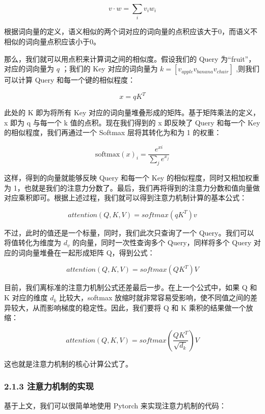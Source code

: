\documentclass[
]{article}
\begin{document}
\[
v·w = \sum_{i}v_iw_i
\]

根据词向量的定义，语义相似的两个词对应的词向量的点积应该大于0，而语义不相似的词向量点积应该小于0。

那么，我们就可以用点积来计算词之间的相似度。假设我们的 Query
为``fruit''，对应的词向量为 \(q\) ；我们的 Key 对应的词向量为
\(k = [v_{apple} v_{banana} v_{chair}]\) ,则我们可以计算 Query
和每一个键的相似程度：

\[
x = qK^T
\]

此处的 K 即为将所有 Key
对应的词向量堆叠形成的矩阵。基于矩阵乘法的定义，x 即为 q 与每一个 k
值的点积。现在我们得到的 x 即反映了 Query 和每一个 Key
的相似程度，我们再通过一个 Softmax 层将其转化为和为 1 的权重：

\[
\text{softmax}(x)_i = \frac{e^{xi}}{\sum_{j}e^{x_j}}
\]

这样，得到的向量就能够反映 Query 和每一个 Key
的相似程度，同时又相加权重为
1，也就是我们的注意力分数了。最后，我们再将得到的注意力分数和值向量做对应乘积即可。根据上述过程，我们就可以得到注意力机制计算的基本公式：

\[
attention(Q,K,V) = softmax(qK^T)v
\]

不过，此时的值还是一个标量，同时，我们此次只查询了一个
Query。我们可以将值转化为维度为 \(d_v\) 的向量，同时一次性查询多个
Query，同样将多个 Query 对应的词向量堆叠在一起形成矩阵 Q，得到公式：

\[
attention(Q,K,V) = softmax(QK^T)V
\]

目前，我们离标准的注意力机制公式还差最后一步。在上一个公式中，如果 Q 和
K 对应的维度 \(d_k\) 比较大，softmax
放缩时就非常容易受影响，使不同值之间的差异较大，从而影响梯度的稳定性。因此，我们要将
Q 和 K 乘积的结果做一个放缩：

\[
attention(Q,K,V) = softmax(\frac{QK^T}{\sqrt{d_k}})V
\]

这也就是注意力机制的核心计算公式了。

\subsubsection{2.1.3
注意力机制的实现}\label{ux6ce8ux610fux529bux673aux5236ux7684ux5b9eux73b0}

基于上文，我们可以很简单地使用 Pytorch 来实现注意力机制的代码：
\end{document}
